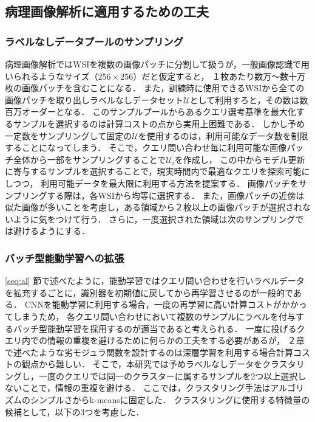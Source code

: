 \subsection{病理画像解析に適用するための工夫}
\subsubsection{ラベルなしデータプールのサンプリング}
病理画像解析ではWSIを複数の画像パッチに分割して扱うが，一般画像認識で用いられるようなサイズ（$256 \times 256$）だと仮定すると，
１枚あたり数万〜数十万枚の画像パッチを含むことになる．
また，訓練時に使用できるWSIから全ての画像パッチを取り出しラベルなしデータセット$\mathcal{U}$として利用すろと，その数は数百万オーダーとなる．
このサンプルプールからあるクエリ選考基準を最大化するサンプルを選択するのは計算コストの点から実用上困難である．
しかし予め一定数をサンプリングして固定の$\mathcal{U}$を使用するのは，利用可能なデータ数を制限することになってしまう．
そこで，クエリ問い合わせ毎に利用可能な画像パッチ全体から一部をサンプリングすることで$\mathcal{U}_i$を作成し，
この中からモデル更新に寄与するサンプルを選択することで，現実時間内で最適なクエリを探索可能にしつつ，
利用可能データを最大限に利用する方法を提案する．
画像パッチをサンプリングする際は，各WSIから均等に選択する．
また，画像パッチの近傍は似た画像が多いことを考慮し，ある領域から２枚以上の画像パッチが選択されないように気をつけて行う．
さらに，一度選択された領域は次のサンプリングでは避けるようにする．

\subsubsection{バッチ型能動学習への拡張}
\ref{seq:al} 節で述べたように，能動学習ではクエリ問い合わせを行いラベルデータを拡充するごとに，識別器を初期値に戻してから再学習させるのが一般的である．
CNNを能動学習に利用する場合，一度の再学習に高い計算コストがかかってしまうため，
各クエリ問い合わせにおいて複数のサンプルにラベルを付与するバッチ型能動学習を採用するのが適当であると考えられる．
一度に投げるクエリ内での情報の重複を避けるために何らかの工夫をする必要があるが，
２章で述べたような劣モジュラ関数を設計するのは深層学習を利用する場合計算コストの観点から難しい．
そこで，本研究では予めラベルなしデータをクラスタリングし，一度のクエリでは同一のクラスターに属するサンプルを2つ以上選択しないことで，情報の重複を避ける．
ここでは，クラスタリング手法はアルゴリズムのシンプルさからk-meansに固定した．
クラスタリングに使用する特徴量の候補として，以下の3つを考慮した．

